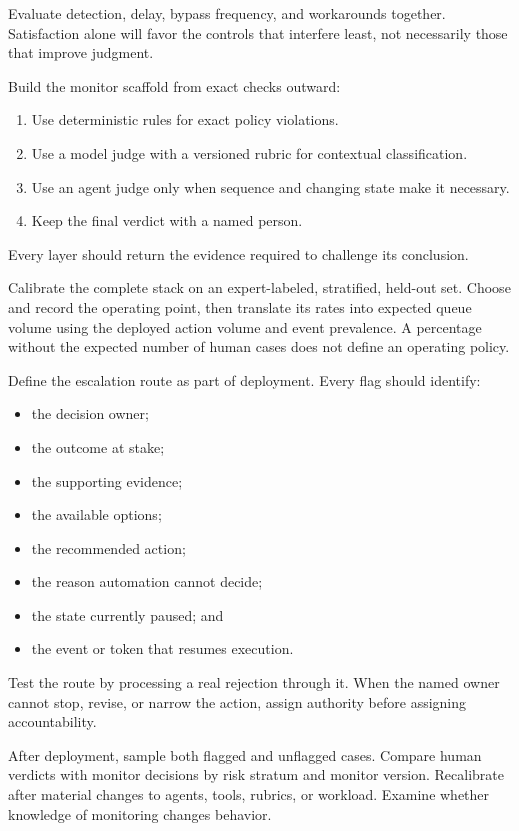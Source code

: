 Evaluate detection, delay, bypass frequency, and workarounds together. Satisfaction alone will favor the controls that interfere least, not necessarily those that improve judgment.

Build the monitor scaffold from exact checks outward:

\begin{enumerate}
\def\labelenumi{\arabic{enumi}.}
\tightlist
\item
  Use deterministic rules for exact policy violations.
\item
  Use a model judge with a versioned rubric for contextual classification.
\item
  Use an agent judge only when sequence and changing state make it necessary.
\item
  Keep the final verdict with a named person.
\end{enumerate}

Every layer should return the evidence required to challenge its conclusion.

Calibrate the complete stack on an expert-labeled, stratified, held-out set. Choose and record the operating point, then translate its rates into expected queue volume using the deployed action volume and event prevalence. A percentage without the expected number of human cases does not define an operating policy.

Define the escalation route as part of deployment. Every flag should identify:

\begin{itemize}
\tightlist
\item
  the decision owner;
\item
  the outcome at stake;
\item
  the supporting evidence;
\item
  the available options;
\item
  the recommended action;
\item
  the reason automation cannot decide;
\item
  the state currently paused; and
\item
  the event or token that resumes execution.
\end{itemize}

Test the route by processing a real rejection through it. When the named owner cannot stop, revise, or narrow the action, assign authority before assigning accountability.

After deployment, sample both flagged and unflagged cases. Compare human verdicts with monitor decisions by risk stratum and monitor version. Recalibrate after material changes to agents, tools, rubrics, or workload. Examine whether knowledge of monitoring changes behavior.

